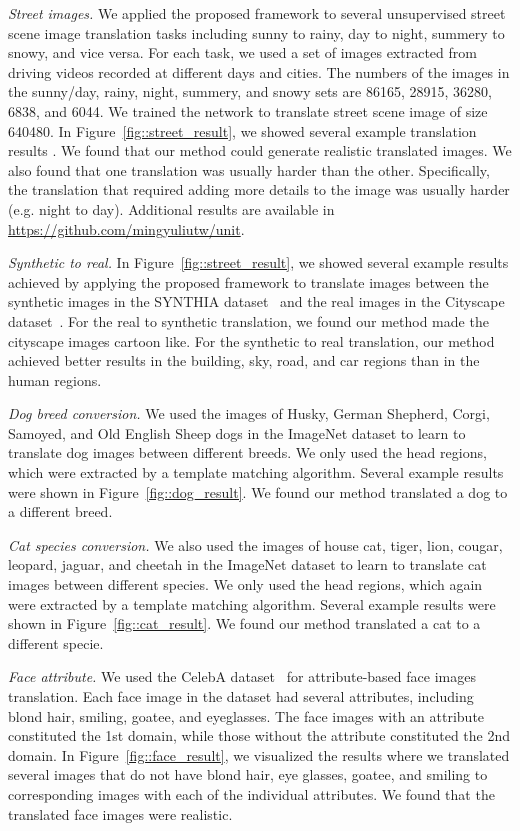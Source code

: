 \documentclass{article}
\begin{document}
{\it Street images.} We applied the proposed framework to several unsupervised street scene image translation tasks including sunny to rainy, day to night, summery to snowy, and vice versa. For each task, we used a set of images extracted from driving videos recorded at different days and cities. The numbers of the images in the sunny/day, rainy, night, summery, and snowy sets are 86165, 28915, 36280, 6838, and 6044. We trained the network to translate street scene image of size  640480. In Figure~\ref{fig::street_result}, we showed several example translation results . We found that our method could generate realistic translated images. We also found that one translation was usually harder than the other. Specifically, the translation that required adding more details to the image was usually harder (e.g. night to day). Additional results are available in \href{https://github.com/mingyuliutw/unit}{https://github.com/mingyuliutw/unit}.

{\it Synthetic to real.} In Figure~\ref{fig::street_result}, we showed several example results achieved by applying the proposed framework to translate images between the synthetic images in the SYNTHIA dataset~\cite{RosCVPR16} and the real images in the Cityscape dataset~\cite{cordts2015cityscapes}. For the real to synthetic translation, we found our method made the cityscape images cartoon like. For the synthetic to real translation, our method achieved better results in the building, sky, road, and car regions than in the human regions. 

{\it Dog breed conversion.} We used the images of Husky, German Shepherd, Corgi, Samoyed, and Old English Sheep dogs in the ImageNet dataset to learn to translate dog images between different breeds. We only used the head regions, which were extracted by a template matching algorithm. Several example results were shown in Figure~\ref{fig::dog_result}. We found our method translated a dog to a different breed. 

{\it Cat species conversion.} We also used the images of house cat, tiger, lion, cougar, leopard, jaguar, and cheetah in the ImageNet dataset to learn to translate cat images between different species. We only used the head regions, which again were extracted by a template matching algorithm. Several example results were shown in Figure~\ref{fig::cat_result}. We found our method translated a cat to a different specie.

{\it Face attribute.} We used the CelebA dataset~\cite{liu2015deep} for attribute-based face images translation. Each face image in the dataset had several attributes, including blond hair, smiling, goatee, and eyeglasses. The face images with an attribute constituted the 1st domain, while those without the attribute constituted the 2nd domain. In Figure~\ref{fig::face_result}, we visualized the results where we translated several images that do not have blond hair, eye glasses, goatee, and smiling to corresponding images with each of the individual attributes. We found that the translated face images were realistic.
\end{document}
